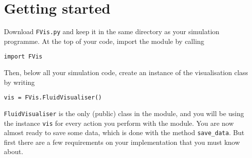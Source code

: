 \documentclass{article}
\newcommand{\ttt}[1]{\texttt{#1}}
\begin{document}
\section{Getting started}
\label{sec:start}
Download \ttt{FVis.py} and keep it in the same directory as your simulation programme. At the top of your code, import the module by calling
\begin{lstlisting}
import FVis
\end{lstlisting}
Then, below all your simulation code, create an instance of the visualisation class by writing
\begin{lstlisting}
vis = FVis.FluidVisualiser()
\end{lstlisting}
\ttt{FluidVisualiser} is the only (public) class in the module, and you will be using the instance \ttt{vis} for every action you perform with the module. You are now almost ready to save some data, which is done with the method \ttt{save\_data}. But first there are a few requirements on your implementation that you must know about.
\end{document}
